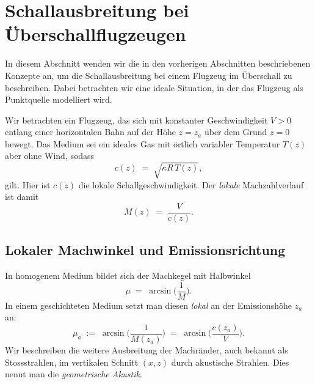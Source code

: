 %
%
%
%
\section{Schallausbreitung bei Überschallflugzeugen
\label{schall:section:teil3}}

In diesem Abschnitt wenden wir die in den vorherigen Abschnitten
beschriebenen Konzepte an, um die Schallausbreitung bei einem
Flugzeug im Überschall zu beschreiben.
Dabei betrachten wir eine ideale Situation, in der das Flugzeug als
Punktquelle modelliert wird.

Wir betrachten ein Flugzeug, das sich mit konstanter Geschwindigkeit
$V>0$ entlang einer horizontalen Bahn auf der Höhe $z=z_a$ über
dem Grund $z=0$ bewegt.
Das Medium sei ein ideales Gas mit örtlich variabler Temperatur
$T(z)$ aber ohne Wind, sodass
\begin{equation}
    c(z) \;=\; \sqrt{\kappa R\,T(z)} ,
    \label{eq:c-of-z}
\end{equation}
gilt. Hier ist $c(z)$ die lokale Schallgeschwindigkeit.
Der \emph{lokale} Machzahlverlauf ist damit
\begin{equation}
    M(z) \;=\; \frac{V}{c(z)} .
\end{equation}

\subsection{Lokaler Machwinkel und Emissionsrichtung}
In homogenem Medium bildet sich der Machkegel mit Halbwinkel
\begin{equation}
    \mu \;=\; \arcsin\!\Big(\frac{1}{M}\Big).
\end{equation}
In einem geschichteten Medium setzt man diesen \emph{lokal} an der
Emissionshöhe $z_a$ an:
\begin{equation}
    \mu_a \;:=\; \arcsin\!\Big(\frac{1}{M(z_a)}\Big)
    \;=\; \arcsin\!\Big(\frac{c(z_a)}{V}\Big) .
    \label{eq:local-mach-angle}
\end{equation}
Wir beschreiben die weitere Ausbreitung der Machränder, auch bekannt als
Stossstrahlen, im vertikalen Schnitt $(x,z)$ durch akustische Strahlen.
Dies nennt man die \emph{geometrische Akustik}.

